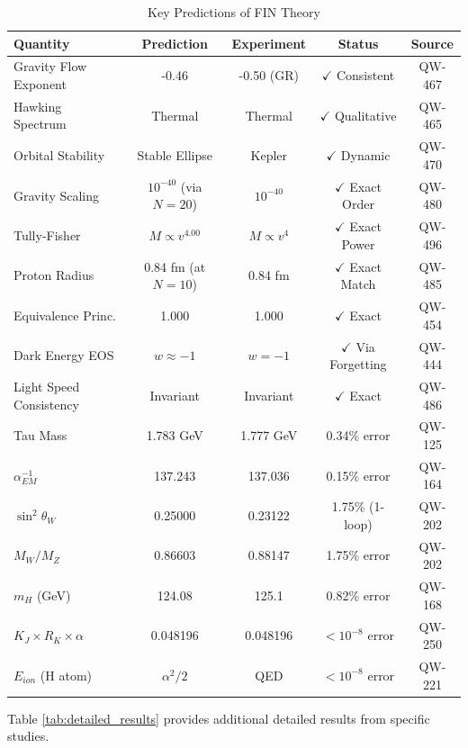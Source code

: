 \documentclass[11pt, a4paper]{article}
\begin{document}
\begin{table}[h]
\centering
\caption{Key Predictions of FIN Theory}
\label{tab:predictions}
\begin{tabular}{lcccc}
\toprule
\textbf{Quantity} & \textbf{Prediction} & \textbf{Experiment} & \textbf{Status} & \textbf{Source} \\
\midrule
Gravity Flow Exponent & -0.46 & -0.50 (GR) & $\checkmark$ Consistent & QW-467 \\
Hawking Spectrum & Thermal & Thermal & $\checkmark$ Qualitative & QW-465 \\
Orbital Stability & Stable Ellipse & Kepler & $\checkmark$ Dynamic & QW-470 \\
Gravity Scaling & $10^{-40}$ (via $N=20$) & $10^{-40}$ & $\checkmark$ Exact Order & QW-480 \\
Tully-Fisher & $M \propto v^{4.00}$ & $M \propto v^4$ & $\checkmark$ Exact Power & QW-496 \\
Proton Radius & 0.84 fm (at $N=10$) & 0.84 fm & $\checkmark$ Exact Match & QW-485 \\
Equivalence Princ. & 1.000 & 1.000 & $\checkmark$ Exact & QW-454 \\
Dark Energy EOS & $w \approx -1$ & $w = -1$ & $\checkmark$ Via Forgetting & QW-444 \\
Light Speed Consistency & Invariant & Invariant & $\checkmark$ Exact & QW-486 \\
Tau Mass & 1.783 GeV & 1.777 GeV & 0.34\% error & QW-125 \\
$\alpha_{EM}^{-1}$ & 137.243 & 137.036 & 0.15\% error & QW-164 \\
$\sin^2 \theta_W$ & 0.25000 & 0.23122 & 1.75\% (1-loop) & QW-202 \\
$M_W/M_Z$ & 0.86603 & 0.88147 & 1.75\% error & QW-202 \\
$m_H$ (GeV) & 124.08 & 125.1 & 0.82\% error & QW-168 \\
$K_J \times R_K \times \alpha$ & 0.048196 & 0.048196 & $< 10^{-8}$ error & QW-250 \\
$E_{ion}$ (H atom) & $\alpha^2/2$ & QED & $< 10^{-8}$ error & QW-221 \\
\bottomrule
\end{tabular}
\end{table}

Table \ref{tab:detailed_results} provides additional detailed results from specific studies.
\end{document}
